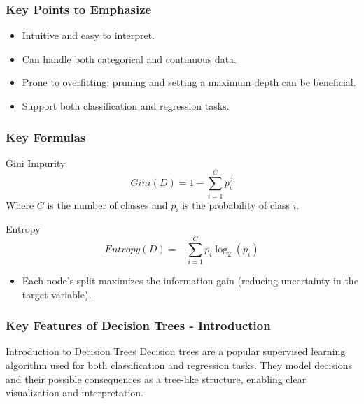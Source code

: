 \documentclass{beamer}
\begin{document}
\begin{frame}[fragile]
    \frametitle{Key Points to Emphasize}
    
    \begin{itemize}
        \item Intuitive and easy to interpret.
        \item Can handle both categorical and continuous data.
        \item Prone to overfitting; pruning and setting a maximum depth can be beneficial.
        \item Support both classification and regression tasks.
    \end{itemize}
\end{frame}

\begin{frame}[fragile]
    \frametitle{Key Formulas}
    
    \begin{block}{Gini Impurity}
        \begin{equation}
        Gini(D) = 1 - \sum_{i=1}^{C} p_i^2
        \end{equation}
        Where \(C\) is the number of classes and \(p_i\) is the probability of class \(i\).
    \end{block}
    
    \begin{block}{Entropy}
        \begin{equation}
        Entropy(D) = - \sum_{i=1}^{C} p_i \log_2(p_i)
        \end{equation}
    \end{block}

    \begin{itemize}
        \item Each node's split maximizes the information gain (reducing uncertainty in the target variable).
    \end{itemize}
\end{frame}

\begin{frame}[fragile]
    \frametitle{Key Features of Decision Trees - Introduction}
    \begin{block}{Introduction to Decision Trees}
        Decision trees are a popular supervised learning algorithm used for both classification and regression tasks. They model decisions and their possible consequences as a tree-like structure, enabling clear visualization and interpretation. 
    \end{block}
\end{frame}
\end{document}
